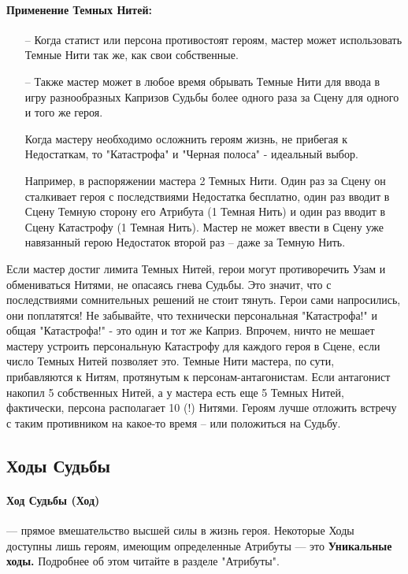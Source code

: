 \paragraph{Применение Темных Нитей:}
\begin{itemize}
    \item[--] Когда статист или персона противостоят героям, мастер может использовать Темные Нити так же, как свои собственные.
    \item[--] Также мастер может в любое время обрывать Темные Нити для ввода в игру разнообразных Капризов Судьбы более одного раза за Сцену для одного и того же героя.
    \begin{tcolorbox}
        Когда мастеру необходимо осложнить героям жизнь, не прибегая к Недостаткам, то "Катастрофа" и "Черная полоса" - идеальный выбор.
    \end{tcolorbox}
    Например, в распоряжении мастера 2 Темных Нити. Один раз за Сцену он сталкивает героя с последствиями Недостатка бесплатно, один раз вводит в Сцену Темную сторону его Атрибута (1 Темная Нить) и один раз вводит в Сцену Катастрофу (1 Темная Нить). Мастер не может ввести в Сцену уже навязанный герою Недостаток второй раз – даже за Темную Нить.
\end{itemize}
Если мастер достиг лимита Темных Нитей, герои могут противоречить Узам и обмениваться Нитями, не опасаясь гнева Судьбы. Это значит, что с последствиями сомнительных решений не стоит тянуть. Герои сами напросились, они поплатятся!
\newline Не забывайте, что технически персональная "Катастрофа!" и общая "Катастрофа!" - это один и тот же Каприз. Впрочем, ничто не мешает мастеру устроить персональную Катастрофу для каждого героя в Сцене, если число Темных Нитей позволяет это.
\newline Темные Нити мастера, по сути, прибавляются к Нитям, протянутым к персонам-антагонистам. Если антагонист накопил 5 собственных Нитей, а у мастера есть еще 5 Темных Нитей, фактически, персона располагает 10 (!) Нитями. Героям лучше отложить встречу с таким противником на какое-то время – или положиться на Судьбу.

\subsection{Ходы Судьбы}
\paragraph{Ход Судьбы (Ход)} — прямое вмешательство высшей силы в жизнь героя. Некоторые Ходы доступны лишь героям, имеющим определенные Атрибуты — это  \textbf{Уникальные ходы.} Подробнее об этом читайте в разделе "Атрибуты".
